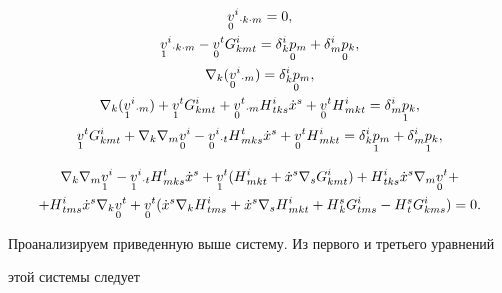 \begin{gather*} 


\down{0}{v}{}^i{}_{\cdot k\cdot m}=0,\\ 


\down{1}{v}{}^i{}_{\cdot k\cdot m}-\down{0}{v}{}^t 


G{}^i_{kmt}=\delta{}^i_k\down{0}{p}{}_m+ 


\delta{}^i_m\down{0}{p}{}_k,\\ 


\nabla_k(\down{0}{v}{}^i{}_{\cdot m})=\delta{}^i_k 


\down{0}{p}{}_m,\\ 


\nabla_k(\down{1}{v}{}^i{}_{\cdot m})+\down{1}{v}{}^tG{}^i_{kmt} 


+\down{0}{v}{}^t{}_{\cdot m}H{}^i_{tks}\Dot x^s+ 


\down{0}{v}{}^tH{}^i_{mkt}=\delta{}^i_m\down{1}{p}{}_k,\\ 


\down{1}{v}{}^tG{}^i_{kmt}+\nabla_k\nabla_m 


\down{0}{v}{}^i-\down{0}{v}{}^i{}_{\cdot t} 


H{}^t_{mks}\Dot x^s+\down{0}{v}{}^tH{}^i_{mkt}= 


\delta{}^i_k\down{1}{p}{}_m+\delta{}^i_m\down{1}{p}{}_k, 


\end{gather*} 


\begin{multline*} 


\nabla_k\nabla_m\down{1}{v}{}^i-\down{1}{v}{}^i{}_{\cdot t} 


H{}^t_{mks}\Dot x^s+\down{1}{v}{}^t(H{}^i_{mkt}+\Dot x^s\nabla_s 


G{}^i_{kmt})+H{}^i_{tks}\Dot x^s\nabla_m\down{0}{v}{}^t+\\ 


+H{}^i_{tms}\Dot x^s\nabla_k\down{0}{v}{}^{t}+\down{0}{v}{}^{t} 


(\Dot x^s\nabla_kH{}^i_{tms}+\Dot x^s\nabla_sH{}^i_{mkt} 


+H{}^s_kG{}^i_{tms}-H{}^s_tG{}^i_{kms})=0. 


\end{multline*} 


 


Проанализируем приведенную выше систему. Из первого и третьего уравнений 


этой системы следует 


